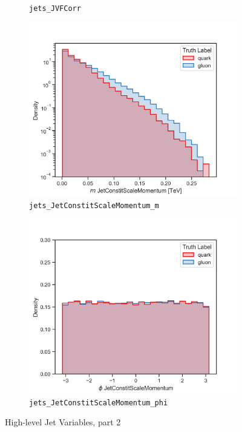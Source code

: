 \begin{figure}[!htb]
\begin{subfigure}[t]{0.49\textwidth}
		\caption{\texttt{jets\_JVFCorr}}
		\label{fig:highlevel_9}
	\end{subfigure}
	\begin{subfigure}[t]{0.49\textwidth}
		\includegraphics[width=1\textwidth]{src/plots/distributions/highlevel/jets_JetConstitScaleMomentum_m.png}
		\caption{\texttt{jets\_JetConstitScaleMomentum\_m}}
		\label{fig:highlevel_10}
	\end{subfigure}
	\begin{subfigure}[t]{0.49\textwidth}
		\includegraphics[width=1\textwidth]{src/plots/distributions/highlevel/jets_JetConstitScaleMomentum_phi.png}
		\caption{\texttt{jets\_JetConstitScaleMomentum\_phi}}
		\label{fig:highlevel_11}
	\end{subfigure}
\caption{High-level Jet Variables, part 2}
\label{fig:highlevel_6-11}
\end{figure}

